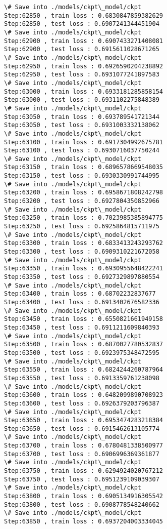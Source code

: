 \documentclass[11pt]{article}
\begin{document}
\begin{Verbatim}[commandchars=\\\{\}]
\# Save into ./models/ckpt\_model/ckpt
Step:62850 , train loss : 0.6830847859382629
Step:62850 , test loss : 0.6907241344451904
\# Save into ./models/ckpt\_model/ckpt
Step:62900 , train loss : 0.6907433271408081
Step:62900 , test loss : 0.6915611028671265
\# Save into ./models/ckpt\_model/ckpt
Step:62950 , train loss : 0.6926590204238892
Step:62950 , test loss : 0.6931077241897583
\# Save into ./models/ckpt\_model/ckpt
Step:63000 , train loss : 0.6933181285858154
Step:63000 , test loss : 0.6931102275848389
\# Save into ./models/ckpt\_model/ckpt
Step:63050 , train loss : 0.693789541721344
Step:63050 , test loss : 0.6931003332138062
\# Save into ./models/ckpt\_model/ckpt
Step:63100 , train loss : 0.6917304992675781
Step:63100 , test loss : 0.6930716037750244
\# Save into ./models/ckpt\_model/ckpt
Step:63150 , train loss : 0.6896578669548035
Step:63150 , test loss : 0.6930330991744995
\# Save into ./models/ckpt\_model/ckpt
Step:63200 , train loss : 0.6958671808242798
Step:63200 , test loss : 0.6927804350852966
\# Save into ./models/ckpt\_model/ckpt
Step:63250 , train loss : 0.7023985385894775
Step:63250 , test loss : 0.6925864815711975
\# Save into ./models/ckpt\_model/ckpt
Step:63300 , train loss : 0.6833413243293762
Step:63300 , test loss : 0.6909310221672058
\# Save into ./models/ckpt\_model/ckpt
Step:63350 , train loss : 0.6930955648422241
Step:63350 , test loss : 0.6927329897880554
\# Save into ./models/ckpt\_model/ckpt
Step:63400 , train loss : 0.68702232837677
Step:63400 , test loss : 0.6913402676582336
\# Save into ./models/ckpt\_model/ckpt
Step:63450 , train loss : 0.6550821661949158
Step:63450 , test loss : 0.6911211609840393
\# Save into ./models/ckpt\_model/ckpt
Step:63500 , train loss : 0.6870027780532837
Step:63500 , test loss : 0.6923975348472595
\# Save into ./models/ckpt\_model/ckpt
Step:63550 , train loss : 0.6824244260787964
Step:63550 , test loss : 0.6913359761238098
\# Save into ./models/ckpt\_model/ckpt
Step:63600 , train loss : 0.6482099890708923
Step:63600 , test loss : 0.6926379203796387
\# Save into ./models/ckpt\_model/ckpt
Step:63650 , train loss : 0.6953474283218384
Step:63650 , test loss : 0.6915462613105774
\# Save into ./models/ckpt\_model/ckpt
Step:63700 , train loss : 0.6780481338500977
Step:63700 , test loss : 0.6906996369361877
\# Save into ./models/ckpt\_model/ckpt
Step:63750 , train loss : 0.6294924020767212
Step:63750 , test loss : 0.6951239109039307
\# Save into ./models/ckpt\_model/ckpt
Step:63800 , train loss : 0.6905134916305542
Step:63800 , test loss : 0.6908778548240662
\# Save into ./models/ckpt\_model/ckpt
Step:63850 , train loss : 0.6937204003334045

\end{Verbatim}
\end{document}
